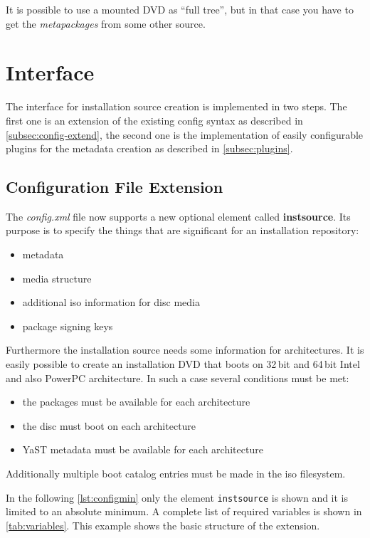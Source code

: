 It is possible to use a mounted DVD as ``full tree'', but in that case you have
to get the \textit{meta\-packages} from some other source.


\section{Interface}
\label{sec:interface}

The interface for installation source creation is implemented in two steps. The
first one is an extension of the existing config syntax as described in
\vref{subsec:config-extend}, the second one is the implementation of easily
configurable plugins for the metadata creation as described in
\vref{subsec:plugins}.


\subsection{Configuration File Extension}
\label{subsec:config-extend}

The \textit{config.xml} file now supports a new optional element called
\textbf{instsource}. Its purpose is to specify the things that are significant
for an installation repository:
\begin{itemize}
  \item{metadata}
  \item{media structure}
  \item{additional iso information for disc media}
  \item{package signing keys}
\end{itemize}

Furthermore the installation source needs some information for architectures. It
is easily possible to create an installation DVD that boots on 32\,bit and
64\,bit Intel and also PowerPC architecture. In such a case several conditions
must be met:
\begin{itemize}
  \item{the packages must be available for each architecture}
  \item{the disc must boot on each architecture}
  \item{YaST metadata must be available for each architecture}
\end{itemize}

Additionally multiple boot catalog entries must be made in the iso filesystem.

In the following \vref{lst:configmin} only the element \texttt{inst\-source} is
shown and it is limited to an absolute minimum. A complete list of required
variables is shown in \vref{tab:variables}.
This example shows the basic structure of the extension.

